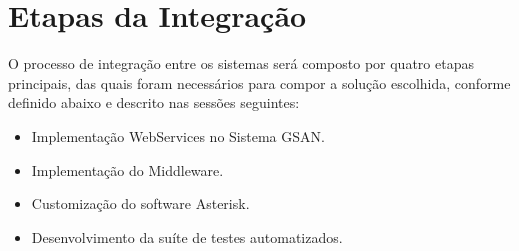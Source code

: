 \section{Etapas da Integração}
O processo de integração entre os sistemas será composto por quatro etapas principais, das quais foram necessários para compor a solução escolhida, conforme definido abaixo e descrito nas sessões seguintes:

\begin{itemize}
	\item Implementação WebServices no Sistema GSAN. 
	\item Implementação do Middleware.
	\item Customização do software Asterisk.
	\item Desenvolvimento da suíte de testes automatizados.
\end{itemize}
